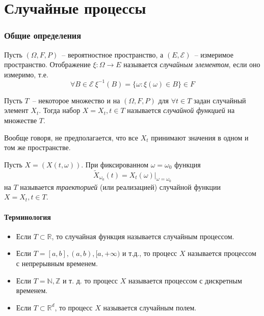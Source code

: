 \part{Случайные процессы}
\section*{Общие определения}
\begin{definition}
Пусть $(\Omega, F, P)$~-- вероятностное пространство, а $(E, \mathcal{E})$~-- измеримое пространство.
Отображение $\xi: \Omega \rightarrow E$ называется \emph{случайным элементом}, если оно измеримо,
т.е. $$\forall B \in \mathcal{E}\ \xi^{-1}(B) = \{\omega: \xi(\omega) \in B\} \in F$$
\end{definition}
\begin{definition}
Пусть $T$~-- некоторое множество и на $(\Omega, F,P)$ для $\forall t\in T$ задан случайный элемент $X_t$. Тогда набор $X = {X_t, t \in T}$ называется \emph{случайной функцией} на множестве $T$. 
\end{definition}

\begin{remark}
Вообще говоря, не предполагается, что все $X_t$ принимают значения в одном и том же пространстве.
\end{remark}

\begin{definition}
Пусть $X = (X(t, \omega))$. При фиксированном $\omega = \omega_0$ функция
$$\tilde{X}_{\omega_0}(t) = X_t(\omega) \vert _{\omega=\omega_0}$$
на $T$ называется \emph{траекторией} (или реализацией) случайной функции $X = {X_t, t\in T}$. 
\end{definition}

\subsection{Терминология}
\begin{itemize}
\item Если $T \subset \mathbb{R}$, то случайная функция называется случайным процессом.
\item Если $T = [a, b], (a, b), [a, +\infty)$ и т.д., то процесс $X$ называется процессом с непрерывным временем.
\item Если $T = \mathbb{N}, \mathbb{Z}$ и т. д. то процесс $X$ называется процессом с дискретным временем.
\item Если $T \subset \mathbb{R}^d$, то процесс $X$ называется случайным полем.
\end{itemize}

